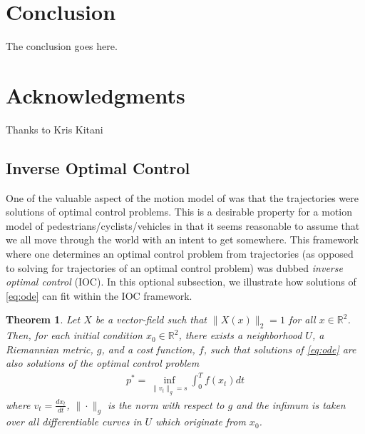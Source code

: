\documentclass[conference]{IEEEtran}
\newtheorem{thm}{Theorem}
\begin{document}
\section{Conclusion} 
\label{sec:conclusion}

The conclusion goes here.

\section*{Acknowledgments}
Thanks to Kris Kitani

\appendix
\subsection{Inverse Optimal Control} \label{app:ioc}
One of the valuable aspect of the motion model of \cite{Kitani2012} was that the trajectories were solutions of optimal control problems.
This is a desirable property for a motion model of pedestrians/cyclists/vehicles in that it seems reasonable to assume that we all move through the world with an intent to get somewhere.
This framework where one determines an optimal control problem from trajectories (as opposed to solving for trajectories of an optimal control problem) was dubbed \emph{inverse optimal control} (IOC).
In this optional subsection, we illustrate how solutions of \ref{eq:ode} can fit within the IOC framework.

\begin{thm}
	Let $X$ be a vector-field such that $\| X(x) \|_2 = 1$ for all $x \in \mathbb{R}^2$.
Then, for each initial condition $x_0 \in \mathbb{R}^2$, there exists a neighborhood $U$, a Riemannian metric, $g$, and a cost function, $f$, 
such that solutions of \eqref{eq:ode} are also solutions of the optimal control problem
\begin{align}
	p^* = \inf_{ \| v_t \|_g = s } \int_0^T f( x_t) dt \label{eq:IOC}
\end{align}
where $v_t = \frac{d x_t}{dt}$, $\| \cdot \|_g$ is the norm with respect to $g$ and the infimum is taken over all differentiable curves in $U$ which originate from $x_0$.
\end{thm}
\end{document}
